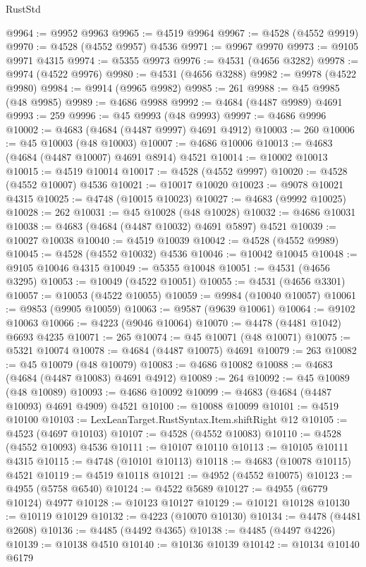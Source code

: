 \begin{lexlean}{RustStd}
\begin{coremodule}
@9964 := @9952 @9963
@9965 := @4519 @9964
@9967 := @4528 (@4552 @9919)
@9970 := @4528 (@4552 @9957) @4536
@9971 := @9967 @9970
@9973 := @9105 @9971 @4315
@9974 := @5355 @9973
@9976 := @4531 (@4656 @3282)
@9978 := @9974 (@4522 @9976)
@9980 := @4531 (@4656 @3288)
@9982 := @9978 (@4522 @9980)
@9984 := @9914 (@9965 @9982)
@9985 := 261
@9988 := @45 @9985 (@48 @9985)
@9989 := @4686 @9988
@9992 := @4684 (@4487 @9989) @4691
@9993 := 259
@9996 := @45 @9993 (@48 @9993)
@9997 := @4686 @9996
@10002 := @4683 (@4684 (@4487 @9997) @4691 @4912)
@10003 := 260
@10006 := @45 @10003 (@48 @10003)
@10007 := @4686 @10006
@10013 := @4683 (@4684 (@4487 @10007) @4691 @8914) @4521
@10014 := @10002 @10013
@10015 := @4519 @10014
@10017 := @4528 (@4552 @9997)
@10020 := @4528 (@4552 @10007) @4536
@10021 := @10017 @10020
@10023 := @9078 @10021 @4315
@10025 := @4748 (@10015 @10023)
@10027 := @4683 (@9992 @10025)
@10028 := 262
@10031 := @45 @10028 (@48 @10028)
@10032 := @4686 @10031
@10038 := @4683 (@4684 (@4487 @10032) @4691 @5897) @4521
@10039 := @10027 @10038
@10040 := @4519 @10039
@10042 := @4528 (@4552 @9989)
@10045 := @4528 (@4552 @10032) @4536
@10046 := @10042 @10045
@10048 := @9105 @10046 @4315
@10049 := @5355 @10048
@10051 := @4531 (@4656 @3295)
@10053 := @10049 (@4522 @10051)
@10055 := @4531 (@4656 @3301)
@10057 := @10053 (@4522 @10055)
@10059 := @9984 (@10040 @10057)
@10061 := @9853 (@9905 @10059)
@10063 := @9587 (@9639 @10061)
@10064 := @9102 @10063
@10066 := @4223 (@9046 @10064)
@10070 := @4478 (@4481 @1042) @6693 @4235
@10071 := 265
@10074 := @45 @10071 (@48 @10071)
@10075 := @5321 @10074
@10078 := @4684 (@4487 @10075) @4691
@10079 := 263
@10082 := @45 @10079 (@48 @10079)
@10083 := @4686 @10082
@10088 := @4683 (@4684 (@4487 @10083) @4691 @4912)
@10089 := 264
@10092 := @45 @10089 (@48 @10089)
@10093 := @4686 @10092
@10099 := @4683 (@4684 (@4487 @10093) @4691 @4909) @4521
@10100 := @10088 @10099
@10101 := @4519 @10100
@10103 := LexLeanTarget.RustSyntax.Item.shiftRight @12
@10105 := @4523 (@4697 @10103)
@10107 := @4528 (@4552 @10083)
@10110 := @4528 (@4552 @10093) @4536
@10111 := @10107 @10110
@10113 := @10105 @10111 @4315
@10115 := @4748 (@10101 @10113)
@10118 := @4683 (@10078 @10115) @4521
@10119 := @4519 @10118
@10121 := @4952 (@4552 @10075)
@10123 := @4955 (@5758 @6540)
@10124 := @4522 @5689
@10127 := @4955 (@6779 @10124) @4977
@10128 := @10123 @10127
@10129 := @10121 @10128
@10130 := @10119 @10129
@10132 := @4223 (@10070 @10130)
@10134 := @4478 (@4481 @2608)
@10136 := @4485 (@4492 @4365)
@10138 := @4485 (@4497 @4226)
@10139 := @10138 @4510
@10140 := @10136 @10139
@10142 := @10134 @10140 @6179

\end{coremodule}
\end{lexlean}
